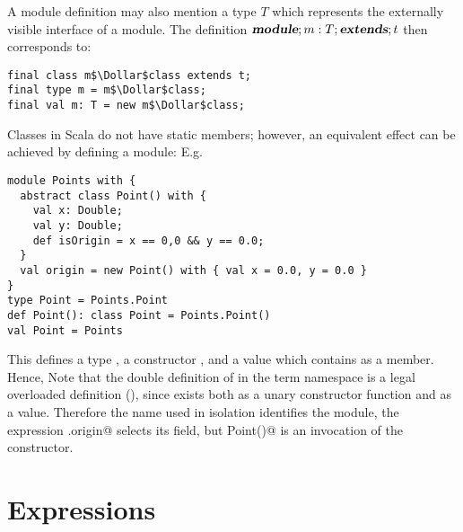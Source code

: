 \documentclass[11pt]{report}
\begin{document}
A module definition may also mention a type $T$ which represents the
externally visible interface of a module. The definition $\mbox{\sl\bfseries module};m:
T;\mbox{\sl\bfseries extends};t$ then corresponds to:
\begin{verbatim}
final class m$\Dollar$class extends t;
final type m = m$\Dollar$class;
final val m: T = new m$\Dollar$class;
\end{verbatim}

\example
Classes in Scala do not have static members; however, an equivalent
effect can be achieved by defining a module:
E.g.
\begin{verbatim}
module Points with {
  abstract class Point() with {
    val x: Double;
    val y: Double;
    def isOrigin = x == 0,0 && y == 0.0;
  }
  val origin = new Point() with { val x = 0.0, y = 0.0 }
}
type Point = Points.Point
def Point(): class Point = Points.Point()
val Point = Points
\end{verbatim}
This defines a type \verb@Point@, a constructor \verb@Point@, and a
value \verb@Point@ which contains \verb@origin@ as a member.  Hence,
Note that the double definition of \verb@Point@ in the term namespace
is a legal overloaded definition (), since
\verb@Point@ exists both as a unary constructor function and as a
value. Therefore the name \verb@Point@ used in isolation identifies
the \verb@Point@ module, the expression \verb@Point.origin@ selects
its \verb@origin@ field, but \verb@new Point()@ is an invocation of
the \verb@Point@ constructor.


\chapter{Expressions}
\label{sec:exprs}
\end{document}

